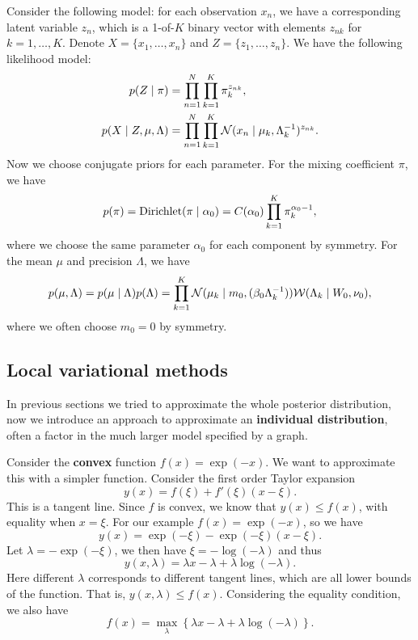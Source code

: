 \documentclass[a4paper]{article}
\begin{document}
Consider the following model: for each observation
$x_n$, we have a corresponding latent variable
$z_n$, which is a 1-of-$K$ binary vector with elements 
$z_{nk}$ for $k = 1, \dots, K$. Denote $X = \{x_1, \dots, 
x_n\}$ and $Z = \{z_1, \dots, z_n\}$. We have the 
following likelihood model:
\[
\begin{aligned}
p(Z \mid \pi) &= \prod_{n=1}^N \prod_{k=1}^K \pi_k^{z_{nk}}, \\
p(X \mid Z, \mu, \Lambda)
&= \prod_{n=1}^N \prod_{k=1}^K \mathcal{N}(x_n \mid \mu_k, \Lambda_k^{-1})
^{z_{nk}}.
\end{aligned}
\]
Now we choose conjugate priors for each parameter. For 
the mixing coefficient $\pi$, we have
\[
\begin{aligned}
p(\pi) = \operatorname{Dirichlet}(\pi \mid \alpha_0)
= C(\alpha_0) \prod_{k=1}^K \pi_k^{\alpha_0 - 1},
\end{aligned}
\]
where we choose the same parameter $\alpha_0$ for each 
component by symmetry. For the mean $\mu$ and precision
$\Lambda$, we have
\[
\begin{aligned}
p(\mu, \Lambda) 
= p(\mu \mid \Lambda) p(\Lambda) 
= \prod_{k=1}^K \mathcal{N} (\mu_k \mid m_0, (\beta_0 \Lambda_k^{-1}))
\mathcal{W} (\Lambda_k \mid W_0, \nu_0),
\end{aligned}
\]
where we often choose $m_0 = 0$ by symmetry.


\subsection{Local variational methods}

In previous sections we tried to approximate the whole
posterior distribution, now we introduce an approach
to approximate an \textbf{individual distribution}, often a 
factor in the much larger model specified by a graph.

Consider the \textbf{convex} function $f(x) = \exp (-x)$. 
We want to approximate this with a simpler function.
Consider the first order Taylor expansion
\[
y(x) = f(\xi) + f'(\xi) (x - \xi).
\]
This is a tangent line.
Since $f$ is convex, we know that $y(x) \leq f(x)$,
with equality when $x = \xi$. For our example
$f(x) = \exp (-x)$, so we have 
\[
y(x) = \exp (- \xi) - \exp (- \xi) (x - \xi).
\]
Let $\lambda = - \exp (- \xi)$, we then have
$\xi = - \log (- \lambda)$ and thus 
\[
y(x, \lambda) = 
\lambda x - \lambda + \lambda \log (- \lambda).
\]
Here different $\lambda$ corresponds to different tangent 
lines, which are all lower bounds of the function. 
That is, $y(x, \lambda) \leq f(x)$. Considering the 
equality condition, we also have 
\[
f(x) = \max_\lambda \left\{ \lambda x - \lambda + \lambda 
\log (- \lambda) \right\}.
\]
\end{document}
